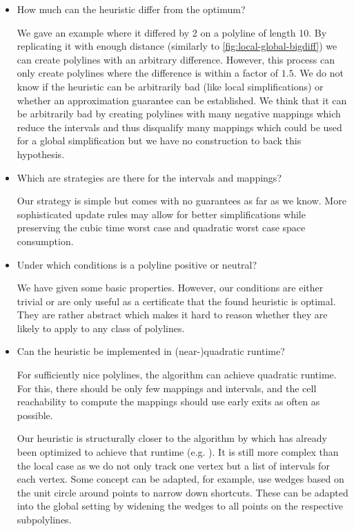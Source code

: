 \begin{itemize}
	\item	How much can the heuristic differ from the optimum?

	We gave an example where it differed by 2 on a polyline of length 10. By replicating it with enough distance (similarly to \cref{fig:local-global-bigdiff}) we can create polylines with an arbitrary difference. However, this process can only create polylines where the difference is within a factor of \(1.5\). We do not know if the heuristic can be arbitrarily bad (like local simplifications) or whether an approximation guarantee can be established. We think that it can be arbitrarily bad by creating polylines with many negative mappings which reduce the intervals and thus disqualify many mappings which could be used for a global simplification but we have no construction to back this hypothesis.

	\item Which are strategies are there for the intervals and mappings?

	Our strategy is simple but comes with no guarantees as far as we know. More sophisticated update rules may allow for better simplifications while preserving the cubic time worst case and quadratic worst case space consumption.

	\item Under which conditions is a polyline positive or neutral?

	We have given some basic properties. However, our conditions are either trivial or are only useful as a certificate that the found heuristic is optimal. They are rather abstract which makes it hard to reason whether they are likely to apply to any class of polylines.

	\item Can the heuristic be implemented in (near-)quadratic runtime?

	For sufficiently nice polylines, the algorithm can achieve quadratic runtime. For this, there should be only few mappings and intervals, and the cell reachability to compute the mappings should use early exits as often as possible. 

	Our heuristic is structurally closer to the algorithm by \citeauthor{computational_geometric_methods_for_polygonal_approximations_of_a_curve} which has already been optimized to achieve that runtime (e.g. \cite{polyline_simplification_under_the_local_frechet_distance_has_almost_quadratic_runtime_in_2d_storandtetal}). It is still more complex than the local case as we do not only track one vertex but a list of intervals for each vertex. Some concept can be adapted, for example, \citeauthor{polyline_simplification_under_the_local_frechet_distance_has_almost_quadratic_runtime_in_2d_storandtetal} use wedges based on the unit circle around points to narrow down shortcuts. These can be adapted into the global setting by widening the wedges to all points on the respective subpolylines. 
\end{itemize}








